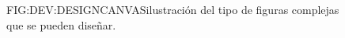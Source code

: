 \begin{figure}{FIG:DEV:DESIGNCANVAS}{ilustración del tipo de figuras complejas que se pueden diseñar.}
\end{figure}


\begin{comment}
En esta etapa se desarrolla gran parte del módulo del Canvas, que será el núcleo de los módulos de la aplicación destinados al diseño de los \dfnpl{espacio-jugable}. Las clases más destacables en este módulo son Canvas y Grid.

La implementación de la clase Canvas atiende a las siguientes funcionalidades:
\begin{enumerate}
	\item detección e interpretación del input de un usuario para añadir o eliminar rectángulos del espacio jugable.
	\item uniones, intersecciones y substracciones de rectángulos con elementos del espacio jugable.
	\item almacenamiento de los espacios jugables descritos por el usuario.
	\item conversión de los elementos del espacio jugable a regiones, para la posterior conversión del diseño a un grafo.
\end{enumerate}

La primera de estas funcionalidades se lleva a cabo detectando inputs del ratón sobre el Canvas. Un input válido se interpreta como la acción de pulsar una tecla del ratón, a la que llamamos comienzo, el movimiento del ratón y la acción de soltar dicha tecla del ratón, a la que llamaremos final.
Las coordenadas del comienzo y del final determinan las coordenadas de las dos esquinas opuestas del rectángulo que describe el usuario con el input, siempre y cuando dicho rectángulo tenga área mayor que cero. Estas coordenadas, sin embargo, se deben rectificar para que el rectángulo se ajuste a la rejilla.
La clase Grid representa dicha rejilla y, mediante métodos como \textit{nearestPoint}, permite, dado un punto, determinar las coordenadas del punto de la rejilla. Haciendo uso de esto, la clase Canvas puede ajustar los rectángulos descritos por el usuario a la rejilla.
La distinción de adición o eliminación de dicho rectángulo se llevaba a cabo teniendo en cuenta qué tecla del ratón fuera pulsada.


\end{comment}
